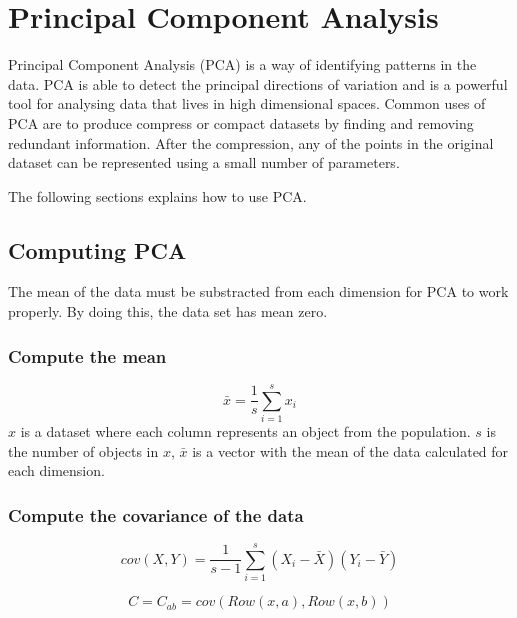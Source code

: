 \chapter{Principal Component Analysis}
\label{sec:apendixPCA}

Principal Component Analysis (PCA) is a way of identifying patterns in the data.
PCA is able to detect the principal directions of variation and
is a powerful tool for analysing data that lives in high dimensional spaces.
Common uses of PCA are to produce compress or compact datasets
by finding and removing redundant information. 
After the compression, any of the points in the original dataset can be represented
using a small number of parameters.

The following sections explains how to use PCA. 

\section{Computing PCA}

The mean of the data must be substracted from each dimension for PCA to work properly.  
By doing this, the data set has mean zero. 

\subsection{Compute the mean}

\begin{equation}
 \bar{x} = \frac{1}{s} \sum^s_{i=1} x_i
\end{equation}
$x$ is a dataset where each column represents an object from the population.  
$s$ is the number of objects in $x$, 
$\bar{x}$ is a vector with the mean of the data calculated for each dimension.

\subsection{Compute the covariance of the data}

\begin{equation}
 cov(X, Y) = \frac{1}{s-1} \sum^s_{i=1} (X_i - \bar{X})(Y_i - \bar{Y})
 \label{equ:covariance}
\end{equation}

\begin{equation}
 C = C_{ab} = cov(Row(x, a), Row(x, b))
 \label{equ:covarianceMatrix}
\end{equation}

